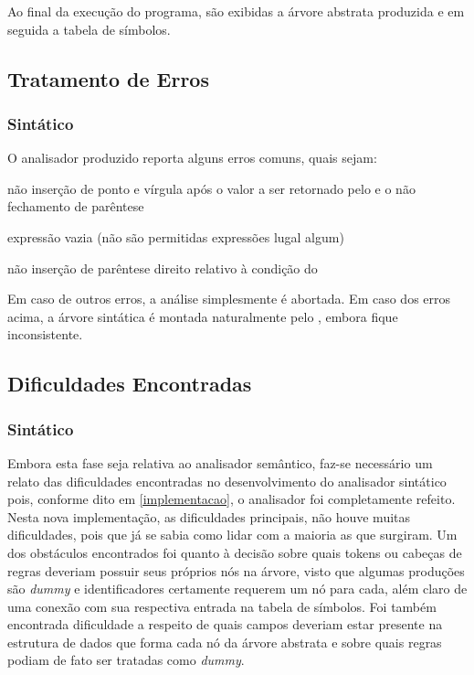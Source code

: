 \documentclass[
	article,			%
	11pt,				%
	oneside,			%
	a4paper,			%
	english,			%
	brazil,				%
	sumario=tradicional
	]{abntex2}
\renewcommand{\it}[1]{\textit{#1}}
\begin{document}
Ao final da execução do programa, são exibidas a árvore abstrata produzida e em seguida a tabela de símbolos.

\subsection{Tratamento de Erros}

\subsubsection{Sintático}
O analisador produzido reporta alguns erros comuns, quais sejam:

\begin{itemize}{
		\item não inserção de ponto e vírgula após o valor a ser retornado pelo  e o não fechamento de parêntese 
		\item expressão vazia (não são permitidas expressões lugal algum)
		\item não inserção de parêntese direito relativo à condição do 
	}
\end{itemize}
Em caso de outros erros, a análise simplesmente é abortada. Em caso dos erros acima, a árvore sintática é montada naturalmente pelo , embora fique inconsistente.

\subsection {Dificuldades Encontradas}

\subsubsection{Sintático}
\label{difSintatico}
Embora esta fase seja relativa ao analisador semântico, faz-se necessário um relato das dificuldades encontradas no desenvolvimento do analisador sintático pois, conforme dito em \ref{implementacao},
o analisador foi completamente refeito. Nesta nova implementação, as dificuldades principais, não houve muitas dificuldades, pois que já se sabia como lidar com a maioria as que surgiram. Um dos obstáculos encontrados foi quanto à decisão sobre quais tokens  ou cabeças de regras deveriam possuir seus próprios nós na árvore, visto que algumas produções são \it{dummy} e identificadores certamente requerem um nó para cada, além claro de uma conexão com sua respectiva entrada na tabela de símbolos. Foi também encontrada dificuldade a respeito de quais campos deveriam estar presente na estrutura de dados que forma cada nó da árvore abstrata e sobre quais regras podiam de fato ser tratadas como \it{dummy}.
\end{document}
